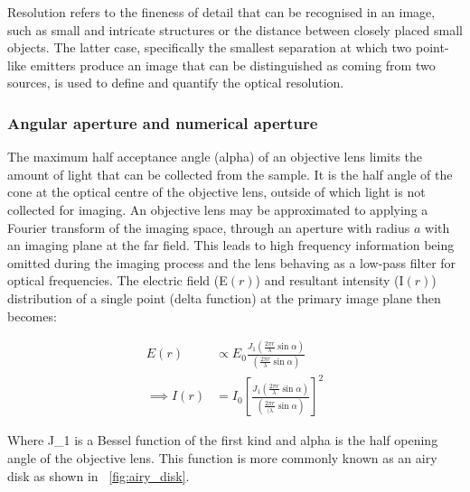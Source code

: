 Resolution refers to the fineness of detail that can be recognised in an image, such as small and intricate structures or the distance between closely placed small objects.
The latter case, specifically the smallest separation at which two point-like emitters produce an image that can be distinguished as coming from two sources, is used to define and quantify the optical resolution.

\subsubsection{Angular aperture and numerical aperture}

The maximum half acceptance angle (\gls{alpha}) of an \gls{objective lens} limits the amount of light that can be collected from the sample.
It is the half angle of the cone at the optical centre of the objective lens, outside of which light is not collected for imaging.
An \gls{objective lens} may be approximated to applying a Fourier transform of the imaging space, through an aperture with radius \(a\) with an imaging plane at the far field.
This leads to high frequency information being omitted during the imaging process and the lens behaving as a low-pass filter for optical frequencies.
The electric field (\gls{E}\((r)\)) and resultant intensity (\gls{I}\((r)\)) distribution of a single point (delta function) at the primary image plane then becomes:

\begin{align}
    E(r) &\propto E_0 \frac{J_1 \left( \frac{2\pi r}{\lambda}\sin \alpha \right)}{ \left(\frac{2\pi r}{\lambda} \sin {\alpha}\right)}\label{eq:E_airy}\\
    \implies
    I(r) &= I_0 \left[\frac{J_1 \left( \frac{2\pi r}{\lambda} \sin \alpha \right)}{ \left(\frac{2\pi r}{(\lambda} \sin {\alpha}\right)}\right]^2\label{eq:I_airy}
\end{align}

Where \gls{J_1} is a Bessel function of the first kind and \gls{alpha} is the half opening angle of the objective lens.
This function is more commonly known as an \Gls{airy disk} as shown in \figurename~\ref{fig:airy_disk}.

